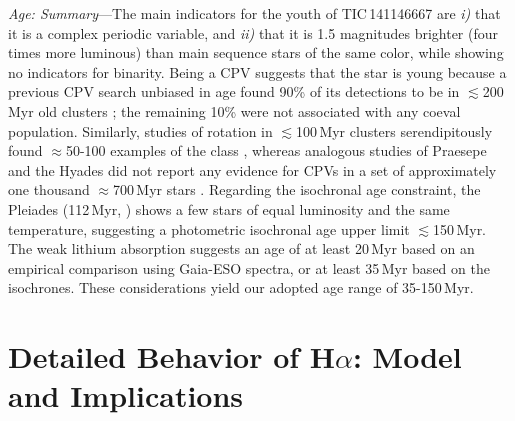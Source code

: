 \documentclass[11pt,twocolumn,tighten]{aastex7}
\begin{document}
{\it Age: Summary}---The main indicators for the youth of
TIC\,141146667 are {\it i)} that it is a complex periodic variable, and
{\it ii)} that it is 1.5 magnitudes brighter (four times more
luminous) than main sequence stars of the same color, while showing no
indicators for binarity.  Being a CPV suggests that the star is young
because a previous CPV search unbiased in age found 90\% of its
detections to be in $\lesssim$200\,Myr old clusters \citep{Bouma2024};
the remaining 10\% were not associated with any coeval population.
Similarly, studies of rotation in $\lesssim$100\,Myr clusters
serendipitously found $\approx$50-100 examples of the class
\citep{Rebull2016,Stauffer2017,Stauffer2018,Rebull2018,Zhan2019,Rebull2020,Stauffer2021,Rebull2022,Popinchalk2023},
whereas analogous studies of Praesepe and the Hyades did not report
any evidence for CPVs in a set of approximately one thousand
$\approx$700\,Myr stars \citep{Rebull2017,Douglas2019,Rampalli2021}.
Regarding the isochronal age constraint, the Pleiades (112\,Myr,
\citealt{Dahm2015}) shows a few stars of equal luminosity and the same
temperature, suggesting a photometric isochronal age upper limit
$\lesssim$150\,Myr.  The weak lithium absorption suggests an age of at
least 20\,Myr based on an empirical comparison using Gaia-ESO spectra,
or at least 35\,Myr based on the \citet{Feiden2016} isochrones.  These
considerations yield our adopted age range of 35-150\,Myr.




\section{Detailed Behavior of H$\alpha$: Model and Implications}
\label{subsec:halpha}
\end{document}
